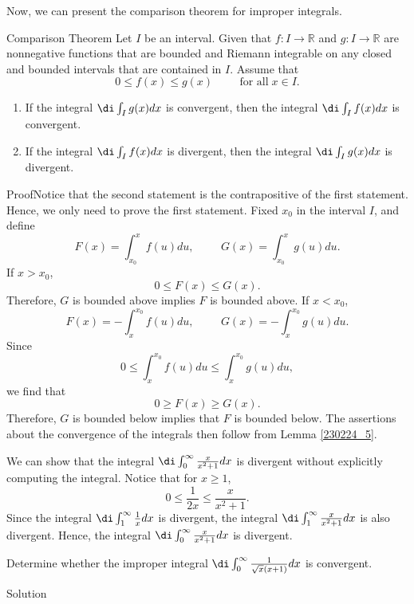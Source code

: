 \begin{example}[label=20230527]{}
Now, we can present the comparison theorem for improper integrals.
\begin{theorem}[label=230224_6]{Comparison Theorem}
 Let $I$ be an interval. Given that $f:I\to\mathbb{R}$ and $g:I\to\mathbb{R}$ are nonnegative functions that are bounded and Riemann integrable on any closed and bounded intervals that are contained in $I$. Assume that
\[0\leq f(x)\leq g(x)\hspace{1cm}\text{for all}\;x\in I.\]
\begin{enumerate}[1.]\item If the integral $\di\int_Ig(x)dx$ is convergent, then the integral $\di\int_I f(x)dx$ is convergent. 
\item If the integral $\di\int_If(x)dx$ is divergent, then the integral $\di\int_I g(x)dx$ is divergent. 
\end{enumerate}
\end{theorem}
\begin{myproof}{Proof}Notice that the second statement is the contrapositive of the first statement. Hence, we only need to prove the first statement. 
Fixed $x_0$ in the interval $I$, and define
\[F(x)=\int_{x_0}^x f(u)du,\hspace{1cm} G(x)=\int_{x_0}^x g(u)du.\]
If $x>x_0$,
\[0\leq F(x)\leq G(x).\]
Therefore, $G$ is bounded above implies $F$ is bounded above.
  If $x<x_0$,
\[F(x)=-\int_{x}^{x_0}f(u)du,\hspace{1cm}G(x)=-\int_{x}^{x_0}g(u)du.\] Since
\[0\leq \int_{x}^{x_0}f(u)du\leq \int_{x}^{x_0}g(u)du,\] we find that
\[0\geq F(x)\geq G(x).\]  Therefore, $G$ is bounded below implies that $F$ is bounded below. The assertions about the convergence of the integrals then follow  from Lemma \ref{230224_5}.
\end{myproof}
\begin{example}
{} We can show that the integral $\di\int_0^{\infty}\frac{x}{x^2+1}dx$ is divergent without explicitly computing the integral. Notice that for $x\geq 1$,
\[0\leq \frac{1}{2x}\leq\frac{x}{x^2+1}.\]
Since the integral $\di\int_1^{\infty}\frac{1}{x}dx$ is divergent, the integral $\di \int_1^{\infty}\frac{x}{x^2+1}dx$ is also divergent. Hence,  the integral $\di\int_0^{\infty}\frac{x}{x^2+1}dx$ is divergent.
\end{example}
  \begin{example}{}
Determine whether the improper integral $\di\int_0^{\infty}\frac{1}{\sqrt{x}(x+1)}dx$ is convergent.
\end{example}
\begin{solution}{Solution}

\end{solution}
\end{example}
